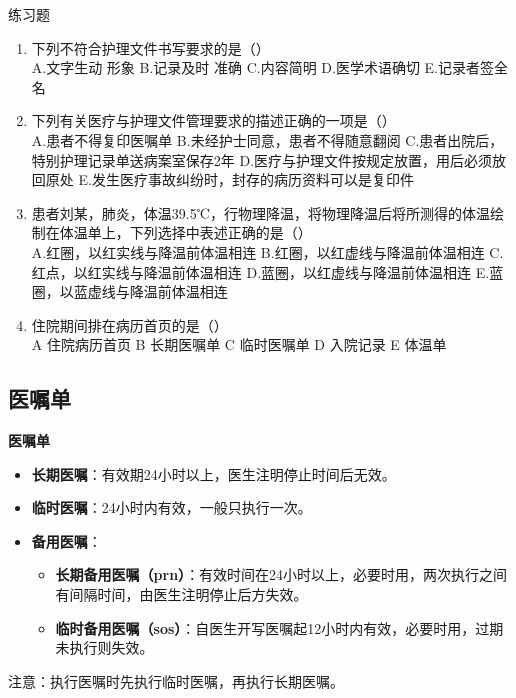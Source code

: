 \documentclass[11pt, a4paper]{ctexart}
\begin{document}
\begin{examplebox}{练习题}
	\begin{enumerate}
		\item 下列不符合护理文件书写要求的是（\qquad）\\
		      A.文字生动 形象 \quad B.记录及时 准确 \quad C.内容简明 \quad D.医学术语确切 \quad E.记录者签全名
		\item 下列有关医疗与护理文件管理要求的描述正确的一项是（\qquad）\\
		      A.患者不得复印医嘱单 \quad B.未经护士同意，患者不得随意翻阅 \quad C.患者出院后，特别护理记录单送病案室保存2年 \quad D.医疗与护理文件按规定放置，用后必须放回原处 \quad E.发生医疗事故纠纷时，封存的病历资料可以是复印件
		\item 患者刘某，肺炎，体温39.5℃，行物理降温，将物理降温后将所测得的体温绘制在体温单上，下列选择中表述正确的是（\qquad）\\
		      A.红圈，以红实线与降温前体温相连 \quad B.红圈，以红虚线与降温前体温相连 \quad C.红点，以红实线与降温前体温相连 \quad D.蓝圈，以红虚线与降温前体温相连 \quad E.蓝圈，以蓝虚线与降温前体温相连
		\item 住院期间排在病历首页的是（\qquad）\\
		      A 住院病历首页 \quad B 长期医嘱单 \quad C 临时医嘱单 \quad D 入院记录 \quad E 体温单
	\end{enumerate}
\end{examplebox}

\subsection{医嘱单}
\textbf{医嘱单}
\begin{itemize}
	\item \textbf{长期医嘱}：有效期24小时以上，医生注明停止时间后无效。
	\item \textbf{临时医嘱}：24小时内有效，一般只执行一次。
	\item \textbf{备用医嘱}：
	      \begin{itemize}
		      \item \textbf{长期备用医嘱（prn）}：有效时间在24小时以上，必要时用，两次执行之间有间隔时间，由医生注明停止后方失效。
		      \item \textbf{临时备用医嘱（sos）}：自医生开写医嘱起12小时内有效，必要时用，过期未执行则失效。
	      \end{itemize}
\end{itemize}
注意：执行医嘱时先执行临时医嘱，再执行长期医嘱。
\end{document}
